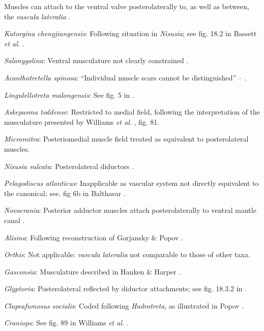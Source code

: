 \documentclass[]{book}
\theoremstyle{definition}
\theoremstyle{definition}
\theoremstyle{definition}
\theoremstyle{remark}
\begin{document}
Muscles can attach to the ventral valve posterolaterally to, as well as
between, the \emph{vascula} \emph{lateralia}
\citep{Popov1992TheCambrian}.

\emph{Kutorgina chengjiangensis}: Following situation in \emph{Nisusia};
see fig. 18.2 in Bassett \emph{et al}.
\citeyearpar{Bassett2001Functionalmorphology}.

\emph{Salanygolina}: Ventral musculature not clearly constrained
\citep{Holmer2009Theenigmatic}.

\emph{Acanthotretella spinosa}: ``Individual muscle scars cannot be
distinguished'' -- \citet{Holmer2006Aspinose}.

\emph{Lingulellotreta malongensis}: See fig. 5 in
\citet{Holmer1997EarlyCambrian}.

\emph{Askepasma toddense}: Restricted to medial field, following the
interpretation of the musculature presented by Williams \emph{et al}.
\citeyearpar{Williams2000BrachiopodaLinguliformea}, fig. 81.

\emph{Micromitra}: Posteriomedial muscle field \citep[text-fig.
6]{Williams1998Thediversity} treated as equivalent to posterolateral
muscles.

\emph{Nisusia sulcata}: Posterolateral diductors \citep[fig. 18.2
in][]{Bassett2001Functionalmorphology}.

\emph{Pelagodiscus atlanticus}: Inapplicable as vascular system not
directly equivalent to the canonical; see. fig 6b in Balthasar
\citeyearpar{Balthasar2009Thebrachiopod}.

\emph{Novocrania}: Posterior adductor muscles attach posterolaterally to
ventral mantle canal \citep{Robinson2014Themuscles}.

\emph{Alisina}: Following reconstruction of Gorjansky \& Popov
\citeyearpar{Gorjansky1986Onthe}.

\emph{Orthis}: Not applicable: \emph{vascula} \emph{lateralia} not
comparable to those of other taxa.

\emph{Gasconsia}: Musculature described in Hanken \& Harper
\citeyearpar{Hanken1985Thetaxonomy}.

\emph{Glyptoria}: Posterolateral reflected by diductor attachments; see
fig. 18.3.2 in \citet{Bassett2001Functionalmorphology}.

\emph{Clupeafumosus socialis}: Coded following \emph{Hadrotreta}, as
illustrated in Popov \citeyearpar{Popov1992TheCambrian}.

\emph{Craniops}: See fig. 89 in Williams \emph{et al}.
\citeyearpar{Williams2000BrachiopodaLinguliformea}.
\end{document}
